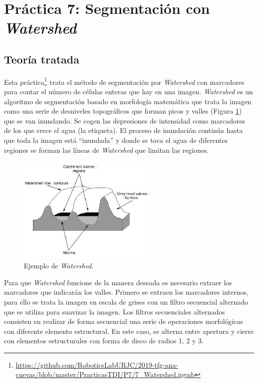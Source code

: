 \section{ Práctica 7: Segmentación con \emph{Watershed}}
\subsection{Teoría tratada}

Esta práctica\footnote{\url{https://github.com/RoboticsLabURJC/2019-tfg-ana-cuevas/blob/master/PracticasTDI/P7/7_Watershed.ipynb}} trata el método de segmentación por \emph{Watershed} con marcadores para contar el número de células enteras que hay en una imagen.\emph{ Watershed} es un algoritmo de segmentación basado en morfología matemática que trata la imagen como una serie de desniveles topográficos que forman picos y valles (Figura \ref{watershed}) que se van inundando. Se cogen las depresiones de intensidad como marcadores de los que crece el agua (la etiqueta). El proceso de inundación continúa hasta que toda la imagen está ``inundada'' y donde se toca el agua de diferentes regiones se forman las líneas de  \emph{Watershed} que limitan las regiones.\\

\begin{figure}[h]
\centering
\includegraphics[width=0.6\textwidth]{imagenes/valles}
\caption{Ejemplo de \emph{Watershed}.}
\label{watershed} 
\end{figure}

Para que \emph{Watershed} funcione de la manera deseada es necesario extraer los marcadores que indicarán los valles. Primero se extraen los marcadores internos, para ello se trata la imagen en escala de grises con un filtro secuencial alternado que se utiliza para suavizar la imagen. Los filtros secuenciales alternados consisten en realizar de forma secuencial una serie de operaciones morfológicas con diferente elemento estructural. En este caso, se alterna entre apertura y cierre con elementos estructurales con forma de disco de radios 1, 2 y 3.\\

